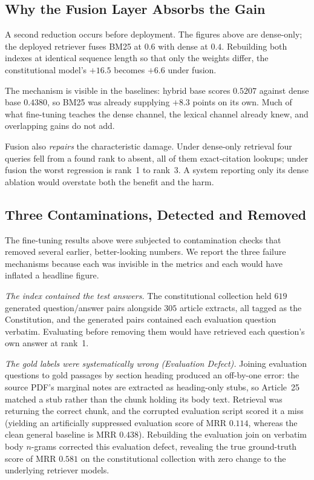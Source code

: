\documentclass[conference]{IEEEtran}
\begin{document}
\subsection{Why the Fusion Layer Absorbs the Gain}
\label{sec:hybrid}
A second reduction occurs before deployment. The figures above are dense-only;
the deployed retriever fuses BM25 at $0.6$ with dense at $0.4$. Rebuilding both
indexes at identical sequence length so that only the weights differ, the
constitutional model's $+16.5$ becomes $\mathbf{+6.6}$ under fusion.

The mechanism is visible in the baselines: hybrid base scores $0.5207$ against
dense base $0.4380$, so BM25 was already supplying $+8.3$ points on its own.
Much of what fine-tuning teaches the dense channel, the lexical channel already
knew, and overlapping gains do not add.

Fusion also \emph{repairs} the characteristic damage. Under dense-only retrieval
four queries fell from a found rank to absent, all of them exact-citation
lookups; under fusion the worst regression is rank~1 to rank~3. A system
reporting only its dense ablation would overstate both the benefit and the harm.



\subsection{Three Contaminations, Detected and Removed}
\label{sec:leakage}
The fine-tuning results above were subjected to contamination checks that removed
several earlier, better-looking numbers. We report the three failure mechanisms because
each was invisible in the metrics and each would have inflated a headline figure.

\emph{The index contained the test answers.} The constitutional collection held
$619$ generated question/answer pairs alongside $305$ article extracts, all
tagged as the Constitution, and the generated pairs contained each evaluation
question verbatim. Evaluating before removing them would have retrieved each
question's own answer at rank~1.

\emph{The gold labels were systematically wrong (Evaluation Defect).} Joining evaluation questions
to gold passages by section heading produced an off-by-one error: the source PDF's
marginal notes are extracted as heading-only stubs, so Article~25 matched a stub
rather than the chunk holding its body text. Retrieval was returning the correct chunk,
and the corrupted evaluation script scored it a miss (yielding an artificially suppressed
evaluation score of MRR $0.114$, whereas the clean general baseline is MRR $0.438$).
Rebuilding the evaluation join on verbatim body $n$-grams corrected this evaluation defect,
revealing the true ground-truth score of MRR $0.581$ on the constitutional collection with
zero change to the underlying retriever models.
\end{document}
